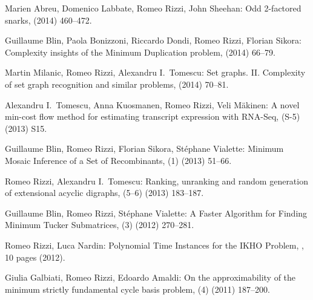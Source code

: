 \begin{etaremune}
  \item {\sc Marien Abreu, Domenico Labbate, Romeo Rizzi, John Sheehan:}
   \newblock  Odd 2-factored snarks,
    (2014) 460--472.

  \item {\sc Guillaume Blin, Paola Bonizzoni, Riccardo Dondi, Romeo Rizzi, Florian Sikora:}
   \newblock  Complexity insights of the Minimum Duplication problem,
    (2014) 66--79.

  \item {\sc Martin Milanic, Romeo Rizzi, Alexandru I.~Tomescu:}
   \newblock  Set graphs. II. Complexity of set graph recognition and similar problems,
    (2014) 70--81. 

  \item {\sc Alexandru I.~Tomescu, Anna Kuosmanen, Romeo Rizzi, Veli M\"akinen:}
   \newblock  A novel min-cost flow method for estimating transcript expression with RNA-Seq,
   (S-5) (2013) S15. 

  \item {\sc Guillaume Blin, Romeo Rizzi, Florian Sikora, St\'ephane Vialette:}
   \newblock  Minimum Mosaic Inference of a Set of Recombinants,
   (1) (2013) 51--66.

  \item {\sc Romeo Rizzi, Alexandru I.~Tomescu:}
   \newblock  Ranking, unranking and random generation of extensional acyclic digraphs,
   (5--6) (2013) 183--187. 

  \item {\sc Guillaume Blin, Romeo Rizzi, St\'ephane Vialette:}
   \newblock  A Faster Algorithm for Finding Minimum Tucker Submatrices,
   (3) (2012) 270--281.

  \item {\sc Romeo Rizzi, Luca Nardin:}
   \newblock  Polynomial Time Instances for the IKHO Problem,
   , 10 pages (2012).

  \item {\sc Giulia Galbiati, Romeo Rizzi, Edoardo Amaldi:}
   \newblock  On the approximability of the minimum strictly fundamental cycle basis problem,
   (4) (2011) 187--200.


\end{etaremune}
